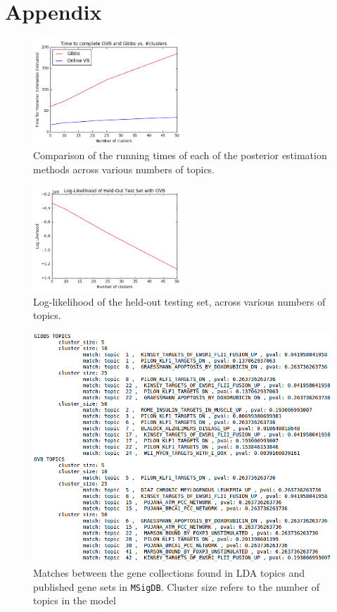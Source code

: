 \documentclass[11pt]{article}
\begin{document}
\section{Appendix}
\begin{figure}
    \centering
    \includegraphics[width=0.5\textwidth]{time}
    \caption{Comparison of the running times of each of the posterior estimation methods across various numbers of topics.}
    \label{fig:time}
\end{figure}

\begin{figure}
    \centering
    \includegraphics[width=0.5\textwidth]{ll}
    \caption{Log-likelihood of the held-out testing set, across various numbers of topics.}
    \label{fig:ll}
\end{figure}

\begin{figure}
    \centering
    \includegraphics[width=1\textwidth]{pathways}
    \caption{Matches between the gene collections found in LDA topics and published gene sets in \texttt{MSigDB}. Cluster size refers to the number of topics in the model}
    \label{fig:pathways}
\end{figure}
\end{document}
